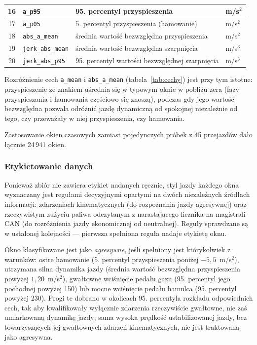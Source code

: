\begin{table}[!h]
\begin{tabular}{| c | p{3.3cm} | p{7.2cm} | p{1.7cm} |}
        16 & \texttt{a\_p95}         & 95. percentyl przyspieszenia & m/s$^2$ \\ \hline
        17 & \texttt{a\_p05}         & 5. percentyl przyspieszenia (hamowanie) & m/s$^2$ \\ \hline
        18 & \texttt{abs\_a\_mean}   & średnia wartość bezwzględna przyspieszenia & m/s$^2$ \\ \hline
        19 & \texttt{jerk\_abs\_mean}& średnia wartość bezwzględna szarpnięcia & m/s$^3$ \\ \hline
        20 & \texttt{jerk\_abs\_p95} & 95. percentyl wartości bezwzględnej szarpnięcia & m/s$^3$ \\ \hline
    \end{tabular}
\end{table}

Rozróżnienie cech \texttt{a\_mean} i \texttt{abs\_a\_mean} (tabela~\ref{tab:cechy})
jest przy tym istotne: przyspieszenie ze znakiem uśrednia się w typowym oknie w pobliżu
zera (fazy przyspieszania i hamowania częściowo się znoszą), podczas gdy jego
wartość bezwzględna pozwala odróżnić jazdę dynamiczną od spokojnej niezależnie
od tego, czy przeważały w niej przyspieszenia, czy hamowania.

Zastosowanie okien czasowych zamiast pojedynczych próbek z 45 przejazdów dało
łącznie 24\,941 okien.

\subsubsection{Etykietowanie danych}

Ponieważ zbiór nie zawiera etykiet nadanych ręcznie, styl jazdy każdego okna
wyznaczany jest regułami decyzyjnymi opartymi na dwóch niezależnych źródłach
informacji: zdarzeniach kinematycznych (do rozpoznania jazdy agresywnej) oraz
rzeczywistym zużyciu paliwa odczytanym z narastającego licznika na magistrali
CAN (do rozróżnienia jazdy ekonomicznej od neutralnej). Reguły sprawdzane są
w ustalonej kolejności --- pierwsza spełniona reguła nadaje etykietę oknu.

Okno klasyfikowane jest jako \emph{agresywne}, jeśli spełniony jest
którykolwiek z warunków: ostre hamowanie (5. percentyl przyspieszenia poniżej
$-5{,}5$~m/s$^2$), utrzymana silna dynamika jazdy (średnia wartość bezwzględna
przyspieszenia powyżej $1{,}20$~m/s$^2$), gwałtowne wciśnięcie pedału gazu
(95. percentyl jego pochodnej powyżej 150) lub mocne wciśnięcie pedału hamulca
(95. percentyl powyżej 230). Progi te dobrano w okolicach 95. percentyla
rozkładu odpowiednich cech, tak aby kwalifikowały wyłącznie zdarzenia
rzeczywiście gwałtowne, nie zaś umiarkowaną dynamikę jazdy; sama wysoka
prędkość ustabilizowanej jazdy, bez towarzyszących jej gwałtownych zdarzeń
kinematycznych, nie jest traktowana jako agresywna.

